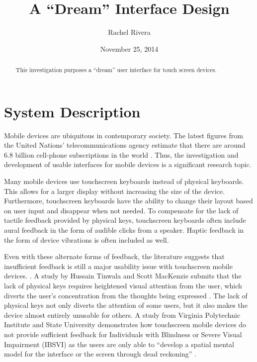 \documentclass[11pt]{article}
\title{A ``Dream'' Interface Design}
\author{Rachel Rivera}
\date{November 25, 2014}
\begin{document}
\maketitle


\begin{abstract}
This investigation purposes a ``dream'' user interface for touch screen devices. 
\end{abstract}


\pagebreak
\tableofcontents



\pagebreak


\section{System Description}
\label{System Description}

Mobile devices are ubiquitous in contemporary society. The latest figures from the United Nations' telecommunications agency estimate that there are around 6.8 billion cell-phone subscriptions in the world \cite{UNTelecommunications	}. Thus, the investigation and development of usable interfaces for mobile devices is a significant research topic.

Many mobile devices use touchscreen keyboards instead of physical keyboards. This allows for a larger display without increasing the size of the device. Furthermore, touchscreen keyboards have the ability to change their layout based on user input and disappear when not needed. To compensate for the lack of tactile feedback provided by physical keys, touchscreen keyboards often include aural feedback in the form of audible clicks from a speaker. Haptic feedback in the form of device vibrations is often included as well.

Even with these alternate forms of feedback, the literature suggests that insufficient feedback is still a major usability issue with touchscreen mobile devices. \cite{Tinwala:2010:ETE:18	68914.1868972, Kane:2011:UGB:1978942.1979001, Hardy:2008:TIT:1409240.1409267, El-Glaly:2013:TTF:2460625.2460665, Buxton:1986:HID:22339.22386}. A study by Hussain Tinwala and Scott MacKenzie submits that the lack of physical keys requires heightened visual attention from the user, which diverts the user's concentration from the thoughts being expressed \cite{Tinwala:2010:ETE:18 68914.1868972}. The lack of physical keys not only diverts the attention of some users, but it also makes the device  almost entirely unusable for others. A study from Virginia Polytechnic Institute and State University demonstrates how touchscreen mobile devices do not provide sufficient feedback for Individuals with Blindness or Severe Visual Impairment (IBSVI) as the users are only able to ``develop a spatial mental model for the interface or the screen through dead reckoning'' \cite{El-Glaly:2013:TTF:2460625.2460665}. 
\end{document}
